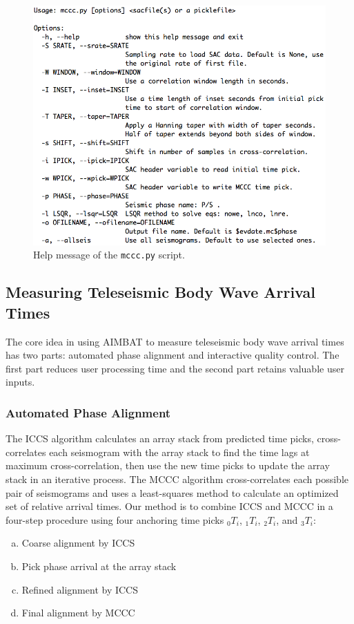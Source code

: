 \documentclass[12pt, titlepage]{article}
\begin{document}
\begin{figure}[!b]
    \centering
    \vspace{2em}
    \includegraphics[width = 0.94 \textwidth]{figs/help-mccc.png}
    \caption{Help message of the \texttt{mccc.py} script. }
    \label{fig:help-mccc}
\end{figure}


\newpage
\subsection{Measuring Teleseismic Body Wave Arrival Times}

The core idea in using AIMBAT to measure teleseismic body wave arrival times has two parts: automated phase alignment and interactive quality control. 
The first part reduces user processing time and the second part retains valuable user inputs.


\subsubsection{Automated Phase Alignment}

The ICCS algorithm calculates an array stack from predicted time picks, cross-correlates each seismogram with the array stack to find the time lags at maximum cross-correlation, then use the new time picks to update the array stack in an iterative process. 
The MCCC algorithm cross-correlates each possible pair of seismograms and uses a least-squares method to calculate an optimized set of relative arrival times.
Our method is to combine ICCS and MCCC in a four-step procedure using four anchoring time picks $_0T_i$, $_1T_i$, $_2T_i$, and $_3T_i$:
\begin{enumerate}[(a)]
\item \label{stepa} Coarse alignment by ICCS
\item \label{stepb} Pick phase arrival at the array stack
\item \label{stepc} Refined alignment by ICCS 
\item \label{stepd} Final alignment by MCCC
\end{enumerate}
\end{document}
